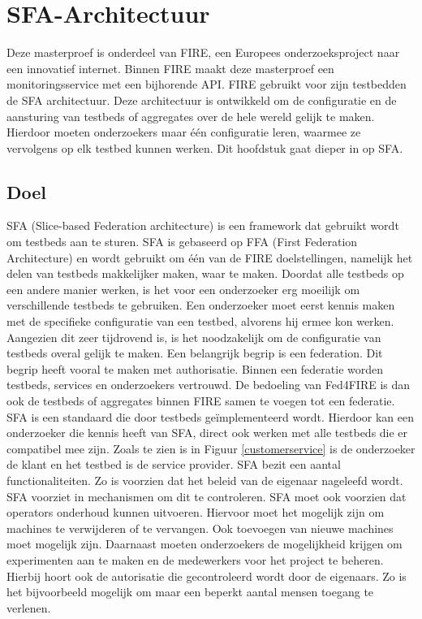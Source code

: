 \chapter{SFA-Architectuur}
\label{SFA}
{\samenvatting Deze masterproef is onderdeel van FIRE, een Europees onderzoeksproject naar een innovatief internet. Binnen FIRE maakt deze masterproef een monitoringsservice met een bijhorende API. FIRE gebruikt voor zijn testbedden de SFA architectuur. Deze architectuur is ontwikkeld om de configuratie en de aansturing van testbeds of aggregates over de hele wereld gelijk te maken. Hierdoor moeten onderzoekers maar \'e\'en configuratie leren, waarmee ze vervolgens op elk testbed kunnen werken. Dit hoofdstuk gaat dieper in op SFA.}

\section{Doel}
\npar
SFA (Slice-based Federation architecture) is een framework dat gebruikt wordt om testbeds aan te sturen\citep{SFA-overview}. SFA is gebaseerd op FFA (First Federation Architecture) en wordt gebruikt om \'e\'en van de FIRE doelstellingen, namelijk het delen van testbeds makkelijker maken, waar te maken. Doordat alle testbeds op een andere manier werken, is het voor een onderzoeker erg moeilijk om verschillende testbeds te gebruiken. Een onderzoeker moet eerst kennis maken met de specifieke configuratie van een testbed, alvorens hij ermee kon werken. Aangezien dit zeer tijdrovend is, is het noodzakelijk om de configuratie van testbeds overal gelijk te maken.
\npar
Een belangrijk begrip is een federation. Dit begrip heeft vooral te maken met authorisatie. Binnen een federatie worden testbeds, services en onderzoekers vertrouwd. De bedoeling van Fed4FIRE is dan ook de testbeds of aggregates binnen FIRE samen te voegen tot een federatie.
\clearpage
\npar
SFA is een standaard die door testbeds ge\"implementeerd wordt.
Hierdoor kan een onderzoeker die kennis heeft van SFA, direct ook werken met alle testbeds die er compatibel mee zijn. Zoals te zien is in Figuur \ref{customerservice} is de onderzoeker de klant en het testbed is de service provider.
\npar
SFA bezit een aantal functionaliteiten. Zo is voorzien dat het beleid van de eigenaar nageleefd wordt. SFA voorziet in mechanismen om dit te controleren.
\npar
SFA moet ook voorzien dat operators onderhoud kunnen uitvoeren. Hiervoor moet het mogelijk zijn om machines te verwijderen of te vervangen. Ook toevoegen van nieuwe machines moet mogelijk zijn. 
\npar
Daarnaast moeten onderzoekers de mogelijkheid krijgen om experimenten aan te maken en de medewerkers voor het project te beheren. Hierbij hoort ook de autorisatie die gecontroleerd wordt door de eigenaars. Zo is het bijvoorbeeld mogelijk om maar een beperkt aantal mensen toegang te verlenen.
\clearpage
